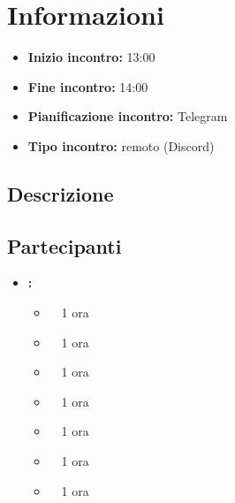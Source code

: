 \section{Informazioni}
\begin{itemize}
	\item \textbf{Inizio incontro:} 13:00
	\item \textbf{Fine incontro:} 14:00
	\item \textbf{Pianificazione incontro:} Telegram
	\item \textbf{Tipo incontro:} remoto (Discord)
\end{itemize}

\subsection{Descrizione}
\DocDescription

\subsection{Partecipanti}

\begin{itemize}
	\item \textbf{\GroupName:}
	\begin{itemize}
		\item \tommaso \ \rightarrow\ 1 ora
		\item \marco \ \rightarrow\ 1 ora
		\item \raul \ \rightarrow\ 1 ora
		\item \sebastiano \ \rightarrow\ 1 ora
		\item \martina \ \rightarrow\ 1 ora
		\item \riccardo \ \rightarrow\ 1 ora
		\item \mattia \ \rightarrow\ 1 ora
	\end{itemize}
\end{itemize}

\clearpage
